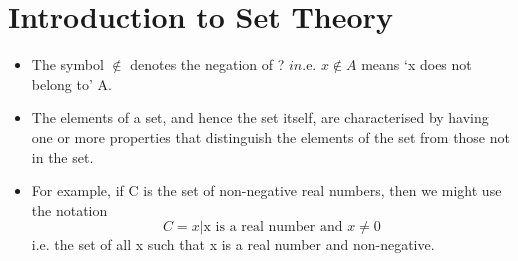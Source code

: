 \documentclass[12pt]{article}
\begin{document}
\section{Introduction to Set Theory}
\begin{itemize}
\item The symbol $\notin$ denotes the negation of ? $in$.e. $x \notin A$ means ‘x does not
belong to’ A.
\item The elements of a set, and hence the set itself, are characterised by having
one or more properties that distinguish the elements of the set from those
not in the set.
\item For example, if C is the set of non-negative real numbers, then we
might use the notation
\[C = {x | \mbox{x is a real number and }x \neq 0}\]
i.e. the set of all x such that x is a real number and non-negative.
\end{itemize}
\end{document}
